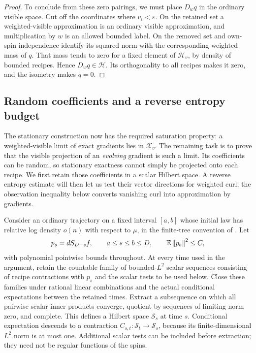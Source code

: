 \begin{proof}
To conclude from these zero pairings, we must place $D_wq$ in the ordinary
visible space.  Cut off the coordinates where $v_i<\varepsilon$.  On the retained set a weighted-visible approximation
is an ordinary visible approximation, and multiplication by $w$ is an
allowed bounded label.  On the removed set 
and own-spin independence identify its squared norm with the corresponding
weighted mass of $q$.  That mass tends to zero for a fixed element of
$\mathcal H_v$, by density of bounded recipes.  Hence $D_wq\in\mathcal H$.
Its orthogonality to all recipes makes it zero, and the isometry makes
$q=0$.
\end{proof}

\subsection{Random coefficients and a reverse entropy budget}

The stationary construction now has the required saturation property:
a weighted-visible limit of exact gradients lies in $\mathcal X_v$.
The remaining task is to prove that the visible projection of an
\emph{evolving} gradient is such a limit.  Its coefficients can be random,
so stationary exactness cannot simply be projected onto each recipe.
We first retain those coefficients in a scalar Hilbert space.  A reverse
entropy estimate will then let us test their vector directions for
weighted curl; the observation inequality below converts vanishing curl
into approximation by gradients.

Consider an ordinary trajectory on a fixed interval $[a,b]$ whose initial
law has relative log density $o(n)$ with respect to $\mu$, in the
finite-tree convention of .  Let
\[
 p_s=dS_{D-s}f,\qquad a\le s\le b\le D,
 \qquad \mathbb E\left\lVert p_b\right\rVert^2\le C,
\]
with polynomial pointwise bounds throughout.  At every time used in the
argument, retain
the countable family of bounded-$L^2$ scalar sequences consisting of
recipe contractions with $p_s$ and the scalar tests to be used below.
Close these families under rational linear combinations and the actual
conditional expectations between the retained times.  Extract a
subsequence on which all pairwise scalar inner products converge,
quotient by sequences of limiting norm zero, and complete.  This defines
a Hilbert space $\mathcal S_s$ at time $s$.  Conditional expectation
descends to a contraction
$C_{s,t}:\mathcal S_t\to\mathcal S_s$, because its finite-dimensional
$L^2$ norm is at most one.  Additional scalar tests can be included
before extraction; they need not be regular functions of the spins.

